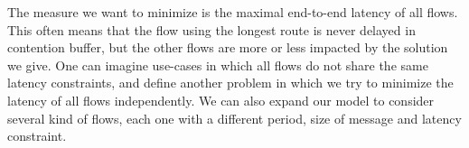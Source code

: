 The measure we want to minimize is the maximal end-to-end latency of all flows. This often means that the flow using the longest route is never delayed in contention buffer, but the other flows are more or less impacted by the solution we give. One can imagine use-cases in which all flows do not share the same latency constraints, and define another problem in which we try to minimize the latency of all flows independently. We can also expand our model to consider several kind of flows, each one with a different period, size of message and latency constraint. 




